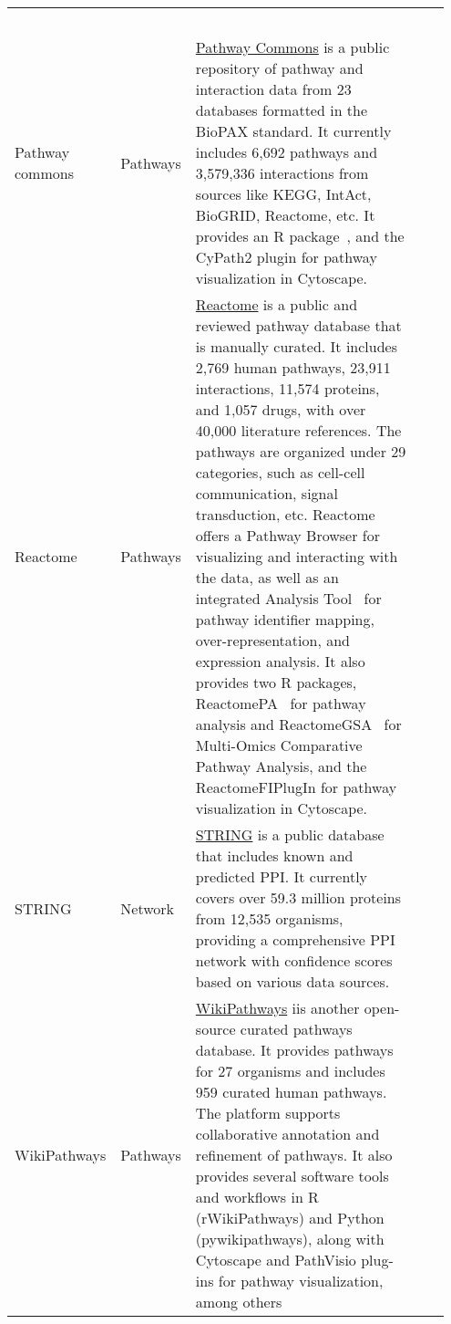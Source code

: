 \begin{newpdflayout}{210mm}{297mm}
\begin{longtable}{@{} 
  p{0.10\linewidth}@{\hspace{6pt}} 
  p{0.08\linewidth}@{\hspace{6pt}} 
  p{0.69\linewidth}@{\hspace{6pt}} 
  p{0.08\linewidth} 
@{}}
  ~\cite{RN91} \\
Pathway commons  & Pathways &
  \href{https://www.pathwaycommons.org/}{Pathway Commons} is a public repository of pathway and interaction data from 23 databases formatted in the BioPAX standard. It currently includes 6,692 pathways and 3,579,336 interactions from sources like KEGG, IntAct, BioGRID, Reactome, etc. It provides an R package~\cite{RN151}, and the CyPath2 plugin for pathway visualization in Cytoscape. &
  ~\cite{RN142} \\
Reactome & Pathways &
  \href{https://reactome.org/}{Reactome} is a public and reviewed pathway database that is manually curated. It includes 2,769 human pathways, 23,911 interactions, 11,574 proteins, and 1,057 drugs, with over 40,000 literature references. The pathways are organized under 29 categories, such as cell-cell communication, signal transduction, etc. Reactome offers a Pathway Browser for visualizing and interacting with the data, as well as an integrated Analysis Tool~\cite{RN150} for pathway identifier mapping, over-representation, and expression analysis. It also provides two R packages, ReactomePA~\cite{RN148} for pathway analysis and ReactomeGSA~\cite{RN149} for Multi-Omics Comparative Pathway Analysis, and the ReactomeFIPlugIn for pathway visualization in Cytoscape. &
  ~\cite{RN143} \\
STRING & Network & 
  \href{https://string-db.org/}{STRING} is a public database that includes known and predicted \gls{PPI}. It currently covers over 59.3 million proteins from 12,535 organisms, providing a comprehensive \gls{PPI} network with confidence scores based on various data sources. &
  ~\cite{RN72} \\
WikiPathways & Pathways &
  \href{https://www.wikipathways.org/}{WikiPathways} iis another open-source curated pathways database. It provides pathways for 27 organisms and includes 959 curated human pathways. The platform supports collaborative annotation and refinement of pathways. It also provides several software tools and workflows in R (rWikiPathways) and Python (pywikipathways), along with Cytoscape and PathVisio plug-ins for pathway visualization, among others~\cite{RN147} &
  ~\cite{RN144} \\
\end{longtable}

\end{newpdflayout}


